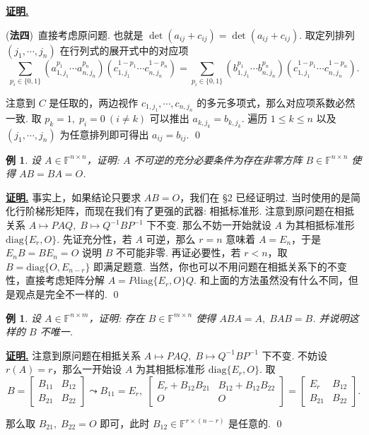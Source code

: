 \documentclass[10pt,openany]{article}
\theoremstyle{thmstyle} %
\theoremstyle{defstyle} %
\theoremstyle{prostyle} %
\theoremstyle{exastyle}
\newtheorem{example}[theorem]{例}
\theoremstyle{remstyle}
\renewenvironment{proof}[1][证明]{\par\underline{\textbf{#1.}} \;\fangsong}{\qed\par}
\newcommand{\F}{\mathbb{F}}
\newcommand{\n}{^{n \times n}}
\newcommand{\mn}{^{m \times n}}
\newcommand{\nm}{^{n \times m}}
\newcommand{\diag}{\mathrm{diag}}
\begin{document}
\begin{proof}
	\vspace{1ex}
	
	(\textbf{法四})\ 直接考虑原问题. 也就是 \( \det(a_{ij}+c_{ij})=\det(a_{ij}+c_{ij}) \). 取定列排列 \( (j_1,\cdots,j_n) \) 在行列式的展开式中的对应项
	\[ \sum_{p_i \in \{0,1\}}^{} (a_{1,j_1}^{p_1}\cdots a_{n,j_n}^{p_n})(c_{1,j_1}^{1-p_1}\cdots c_{n,j_n}^{1-p_n})=\sum_{p_i \in \{0,1\}}^{} (b_{1,j_1}^{p_1}\cdots b_{n,j_n}^{p_n})(c_{1,j_1}^{1-p_1}\cdots c_{n,j_n}^{1-p_n}). \]
	
	注意到 \( C \) 是任取的，两边视作 \( c_{1,j_1},\cdots, c_{n,j_n} \) 的多元多项式，那么对应项系数必然一致. 取 \( p_k=1, \; p_i=0 \ (i \neq k) \) 可以推出 \( a_{k,j_k}=b_{k,j_k} \). 遍历 \( 1 \leq k \leq n \) 以及 \( (j_1,\cdots,j_n) \) 为任意排列即可得出 \( a_{ij}=b_{ij} \).
\end{proof}

\begin{example}
	设 \( A \in \F\n \)，证明: \( A \) 不可逆的充分必要条件为存在非零方阵 \( B \in \F\n \) 使得 \( AB=BA=O \).
\end{example}

\begin{proof}
	事实上，如果结论只要求 \( AB=O \)，我们在 \S 2 已经证明过. 当时使用的是简化行阶梯形矩阵，而现在我们有了更强的武器: 相抵标准形. 注意到原问题在相抵关系 \( A \mapsto PAQ, \; B \mapsto Q^{-1}BP^{-1} \) 下不变. 那么不妨一开始就设 \( A \) 为其相抵标准形 \( \diag\{E_r,O\} \). 先证充分性，若 \( A \) 可逆，那么 \( r=n \) 意味着 \( A=E_n \)，于是 \( E_nB=BE_n=O \) 说明 \( B \) 不可能非零. 再证必要性，若 \( r<n \)，取 \( B=\diag\{O,E_{n-r}\} \) 即满足题意.
	当然，你也可以不用问题在相抵关系下的不变性，直接考虑矩阵分解 \( A=P\diag\{E_r,O\} Q \). 和上面的方法虽然没有什么不同，但是观点是完全不一样的.
\end{proof}


\begin{example} \label{3.2.3}
	设 \( A \in \F\nm \)，证明: 存在 \( B \in \F\mn \) 使得 \( ABA=A, \; BAB=B \). 并说明这样的 \( B \) 不唯一.
\end{example}

\begin{proof}
	注意到原问题在相抵关系 \( A \mapsto PAQ, \; B \mapsto Q^{-1}BP^{-1} \) 下不变. 不妨设 \( r(A)=r \)，那么一开始设 \( A \) 为其相抵标准形 \( \diag\{E_r,O\} \). 取
	\[ B=\begin{bmatrix}
		B_{11} & B_{12} \\
		B_{21} & B_{22} 
	\end{bmatrix} \leadsto B_{11}=E_r, \; \begin{bmatrix}
	E_r+B_{12}B_{21} & B_{12}+B_{12}B_{22} \\
	O & O 
	\end{bmatrix}=\begin{bmatrix}
	E_r & B_{12} \\
	B_{21} & B_{22} 
	\end{bmatrix}. \]
	
	那么取 \( B_{21}, \; B_{22}=O \) 即可，此时 \( B_{12} \in \F^{r \times (n-r)} \) 是任意的.
\end{proof}
\end{document}
